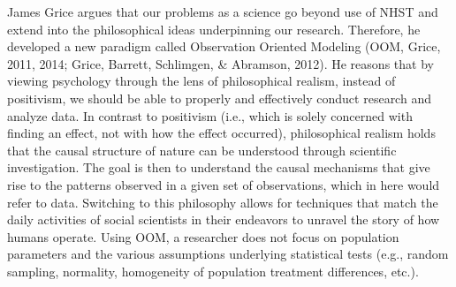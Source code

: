 \documentclass[english,man]{apa6}
\theoremstyle{definition}
\theoremstyle{definition}
\theoremstyle{definition}
\theoremstyle{remark}
\begin{document}
James Grice argues that our problems as a science go beyond use of NHST
and extend into the philosophical ideas underpinning our research.
Therefore, he developed a new paradigm called Observation Oriented
Modeling (OOM, Grice, 2011, 2014; Grice, Barrett, Schlimgen, \&
Abramson, 2012). He reasons that by viewing psychology through the lens
of philosophical realism, instead of positivism, we should be able to
properly and effectively conduct research and analyze data. In contrast
to positivism (i.e., which is solely concerned with finding an effect,
not with how the effect occurred), philosophical realism holds that the
causal structure of nature can be understood through scientific
investigation. The goal is then to understand the causal mechanisms that
give rise to the patterns observed in a given set of observations, which
in here would refer to data. Switching to this philosophy allows for
techniques that match the daily activities of social scientists in their
endeavors to unravel the story of how humans operate. Using OOM, a
researcher does not focus on population parameters and the various
assumptions underlying statistical tests (e.g., random sampling,
normality, homogeneity of population treatment differences, etc.).
\end{document}
